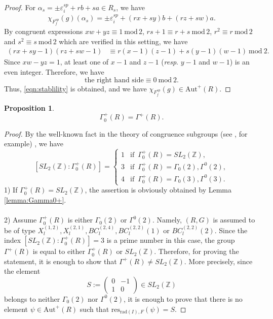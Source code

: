 \documentclass[11pt]{amsart}
\newtheorem{prop}[thm]{Proposition}%
\begin{document}
{{\begin{proof}
For $\alpha_s=\pm\varepsilon_i^{sp}+rb+sa\in R_s$, we have
\begin{align*}
\chi_{F_f^{sp}}(g)(\alpha_s)=\pm \varepsilon_i^{sp}+(rx+sy)b+(rz+sw)a.
\end{align*}
By congruent expressions
$xw+yz\equiv 1\ \mathrm{mod}\,2$, $rs+1\equiv r+s\ \mathrm{mod}\,2$, 
$r^2\equiv r\ \mathrm{mod}\,2$ and $s^2\equiv s\ \mathrm{mod}\,2$ which
are verified in this setting, we have
\begin{align*}
(rx+sy-1)(rz+sw-1)&\equiv r(x-1)(z-1)+s(y-1)(w-1)\ \mathrm{mod}\ 2.
\end{align*}
Since $xw-yz=1$, at least one of $x-1$ and $z-1$ ({\it resp}. $y-1$ and $w-1$) is 
an even integer. Therefore,  we have
\[\mbox{the right hand side} \equiv 0 \ \mathrm{mod}\ 2.\] 
Thus, \eqref{eqn:stablility} is obtained, and we have 
$\chi_{F_f^{sp}}(g)\in \mathrm{Aut}^+(R)$.
\end{proof}
\begin{prop}\label{prop:Gamma}
\begin{equation}
\Gamma_0^+(R)=\Gamma^+(R).
\end{equation}
\end{prop}
\begin{proof}
By the well-known fact in the theory of congruence subgroups 
(see \cite{Koblitz1993}, for example)
, we have
\[[{SL}_2(\mathbb{Z}):\Gamma_0^+(R)]=\begin{cases}
1 & \mbox{if }\,\Gamma_0^+(R)={SL}_2(\mathbb{Z}) ,\\
3 & \mbox{if }\,\Gamma_0^+(R)=\Gamma_0(2), \Gamma^0(2),\\
4 & \mbox{if }\,\Gamma_0^+(R)=\Gamma_0(3), \Gamma^0(3).
\end{cases}\]
1) If $\Gamma_0^+(R)={SL}_2(\mathbb{Z})$, 
the assertion is obviously obtained by Lemma \ref{lemma:Gamma0+}.  \\
\\
2) Assume $\Gamma_{0}^+(R)$ is either $\Gamma_0(2)$ or $\Gamma^0(2)$. 
Namely, $(R,G)$ is assumed to be of type $X_l^{(1,2)},X_l^{(2,1)},
BC_l^{(2,4)},BC_l^{(2,2)}(1)$ or $BC_l^{(2,2)}(2)$.
Since the index $[{SL}_2(\mathbb{Z}):\Gamma_{0}^+(R)]=3$ is a prime number
in this case, the group $\Gamma^+(R)$ is equal to either $\Gamma_{0}^+(R)$ or 
${SL}_2(\mathbb{Z})$. Therefore, for proving the statement, 
it is enough to show that $\Gamma^+(R)\ne {SL}_2(\mathbb{Z})$.  
More precisely, since the element 
\[S:=\begin{pmatrix} 0 & -1 \\ 1 & 0\end{pmatrix}\in {SL}_2(\mathbb{Z})\] 
belongs to neither $\Gamma_0(2)$ nor $\Gamma^0(2)$, it is enough to prove that 
there is no element $\psi\in \mathrm{Aut}^+(R)$ such that $\mathrm{res}_{\mathrm{rad}(I),F}(\psi)=S$.


\end{proof}}}
\end{document}
